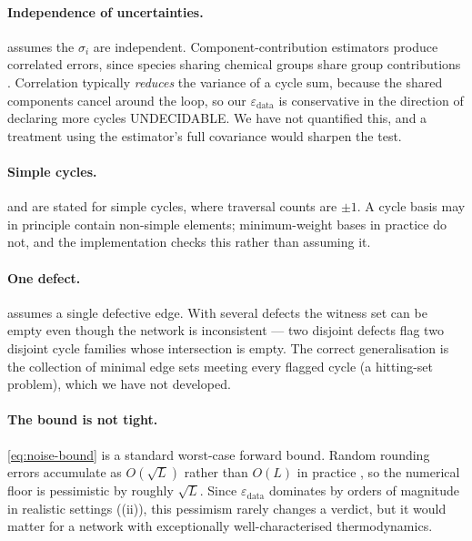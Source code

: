 \documentclass[11pt,twocolumn,a4paper]{article}
\theoremstyle{pstyle}
\theoremstyle{definition}
\theoremstyle{remark}
\newcommand{\eps}{\varepsilon}
\newcommand{\epsdata}{\eps_{\mathrm{data}}}
\begin{document}
\paragraph{Independence of uncertainties.}  assumes
the $\sigma_i$ are independent. Component-contribution estimators
produce correlated errors, since species sharing chemical groups share
group contributions \citep{noor2013}. Correlation typically
\emph{reduces} the variance of a cycle sum, because the shared
components cancel around the loop, so our $\epsdata$ is conservative in
the direction of declaring more cycles \textsf{UNDECIDABLE}. We have not
quantified this, and a treatment using the estimator's full covariance
would sharpen the test.

\paragraph{Simple cycles.}  and
 are stated for simple cycles, where
traversal counts are $\pm1$. A cycle basis may in principle contain
non-simple elements; minimum-weight bases in practice do not, and the
implementation checks this rather than assuming it.

\paragraph{One defect.}  assumes a single
defective edge. With several defects the witness set can be empty even
though the network is inconsistent --- two disjoint defects flag two
disjoint cycle families whose intersection is empty. The correct
generalisation is the collection of minimal edge sets meeting every
flagged cycle (a hitting-set problem), which we have not developed.

\paragraph{The bound is not tight.} \eqref{eq:noise-bound} is a standard
worst-case forward bound. Random rounding errors accumulate as
$O(\sqrt{L})$ rather than $O(L)$ in practice \citep{higham2002}, so the
numerical floor is pessimistic by roughly $\sqrt{L}$. Since $\epsdata$
dominates by orders of magnitude in realistic settings
((ii)), this pessimism rarely changes a verdict,
but it would matter for a network with exceptionally well-characterised
thermodynamics.

\end{document}
